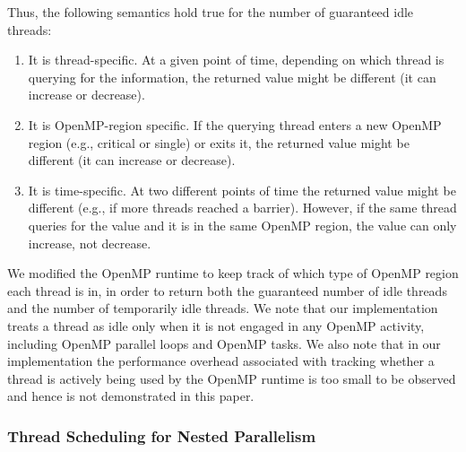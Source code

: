 Thus, the following semantics hold true for the number of guaranteed
idle threads:

\begin{enumerate}
\setlength{\parskip}{-0.2ex}
\vspace{-1.0ex}

\item It is thread-specific.  At a given point of time, depending on
  which thread is querying for the information, the returned value
  might be different (it can increase or decrease).

\item It is OpenMP-region specific.  If the querying thread enters a
  new OpenMP region (e.g., critical or single) or exits it, the
  returned value might be different (it can increase or decrease).

\item It is time-specific.  At two different points of time the
  returned value might be different (e.g., if more threads reached a
  barrier).  However, if the same thread queries for the value and it
  is in the same OpenMP region, the value can only increase, not
  decrease.

\vspace{-1.0ex}
\end{enumerate}

We modified the OpenMP runtime to keep track of which type of OpenMP
region each thread is in, in order to return both the guaranteed
number of idle threads and the number of temporarily idle threads.  We
note that our implementation treats a thread as idle only when it is
not engaged in any OpenMP activity, including OpenMP parallel loops
and OpenMP tasks.  We also note that in our implementation the
performance overhead associated with tracking whether a thread is
actively being used by the OpenMP runtime is too small to be observed
and hence is not demonstrated in this paper.


\subsubsection{Thread Scheduling for Nested Parallelism}


